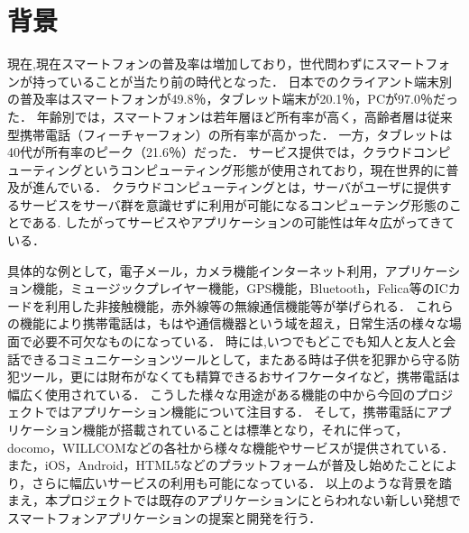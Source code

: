 \section{背景}
\par 
現在,現在スマートフォンの普及率は増加しており，世代問わずにスマートフォンが持っていることが当たり前の時代となった．
日本でのクライアント端末別の普及率はスマートフォンが49.8％，タブレット端末が20.1％，PCが97.0％だった．
年齢別では，スマートフォンは若年層ほど所有率が高く，高齢者層は従来型携帯電話（フィーチャーフォン）の所有率が高かった．
一方，タブレットは40代が所有率のピーク（21.6％）だった．
サービス提供では，クラウドコンピューティングというコンピューティング形態が使用されており，現在世界的に普及が進んでいる．
クラウドコンピューティングとは，サーバがユーザに提供するサービスをサーバ群を意識せずに利用が可能になるコンピューテング形態のことである.
したがってサービスやアプリケーションの可能性は年々広がってきている．
\par
具体的な例として，電子メール，カメラ機能インターネット利用，アプリケーション機能，ミュージックプレイヤー機能，GPS機能，Bluetooth，Felica等のICカードを利用した非接触機能，赤外線等の無線通信機能等が挙げられる．
これらの機能により携帯電話は，もはや通信機器という域を超え，日常生活の様々な場面で必要不可欠なものになっている．
時には,いつでもどこでも知人と友人と会話できるコミュニケーションツールとして，またある時は子供を犯罪から守る防犯ツール，更には財布がなくても精算できるおサイフケータイなど，携帯電話は幅広く使用されている．
こうした様々な用途がある機能の中から今回のプロジェクトではアプリケーション機能について注目する．
そして，携帯電話にアプリケーション機能が搭載されていることは標準となり，それに伴って，docomo，WILLCOMなどの各社から様々な機能やサービスが提供されている．
また，iOS，Android，HTML5などのプラットフォームが普及し始めたことにより，さらに幅広いサービスの利用も可能になっている．
以上のような背景を踏まえ，本プロジェクトでは既存のアプリケーションにとらわれない新しい発想でスマートフォンアプリケーションの提案と開発を行う．
